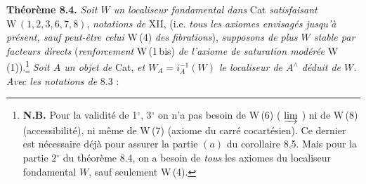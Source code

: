 \documentclass[11pt]{article}
\newcommand{\printedpage}[1]{\marginpar{\footnotesize p.~#1}}
\newcommand{\msp}[1]{\marginpar{\footnotesize [#1]}}
\newcommand{\chap}{^{\wedge}}
\begin{document}
\printedpage{58}
\msp{page 105}
\textbf{Théorème 8.4.} \textit{Soit $W$ un localiseur fondamental dans} Cat \textit{satisfaisant} $\mathrm{W}\,(1,2,3,6,7,8)$, \textit{notations de} XII, (i.e. \textit{tous les axiomes envisagés jusqu'à présent, sauf peut-être celui} W\,(4) \textit{des fibrations}), \textit{supposons de plus $W$ stable par facteurs directs} (\textit{renforcement} W\,(1\,bis) \textit{de l'axiome de saturation modérée} W\,(1)).\footnote[37]{\textbf{N.B.} Pour la validité de 1$^\circ$, 3$^\circ$ on n'a pas besoin de W\,(6) ( $\varinjlim$ ) ni de W\,(8) (accessibilité), ni même de W\,(7) (axiome du carré cocartésien). Ce dernier est nécessaire déjà pour assurer la partie $(a)$ du corollaire 8.5. Mais pour la partie 2$^\circ$ du théorème 8.4, on a besoin de \textit{tous} les axiomes du localiseur fondamental $W$, sauf seulement W\,(4).} \textit{Soit $A$ un objet de} Cat, \textit{et $W_A=i_A^{-1}(W)$ le localiseur de $A\chap$ déduit de $W$. Avec les notations de} 8.3 :
\end{document}
